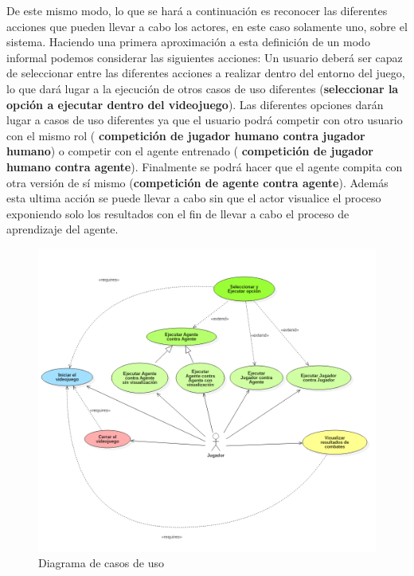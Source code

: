 \bigskip

De este mismo modo, lo que se hará a continuación es reconocer las diferentes acciones que pueden llevar a cabo los actores, en este caso solamente uno, sobre el sistema. Haciendo una primera aproximación a esta definición de un modo informal podemos considerar las siguientes acciones: Un usuario deberá ser capaz de seleccionar entre las diferentes acciones a realizar dentro del entorno del juego, lo que dará lugar a la ejecución de otros casos de uso diferentes (\textbf{seleccionar la opción a ejecutar dentro del videojuego}). Las diferentes opciones darán lugar a casos de uso diferentes ya que el usuario podrá competir con otro usuario con el mismo rol (\textbf{ competición de jugador humano contra jugador humano}) o competir con el agente entrenado (\textbf{ competición de jugador humano contra agente}). Finalmente se podrá hacer que el agente compita con otra versión de sí mismo (\textbf{competición de agente contra agente}). Además esta ultima acción se puede llevar a cabo sin que el actor visualice el proceso exponiendo solo los resultados con el fin de llevar a cabo el proceso de aprendizaje del agente.

\bigskip

\begin{figure}
	\centerline{\includegraphics[width=20cm]{diagramas/casosDeUsoCropped.png}}
	\caption{Diagrama de casos de uso}
	\label{casos_de_uso}
\end{figure}

